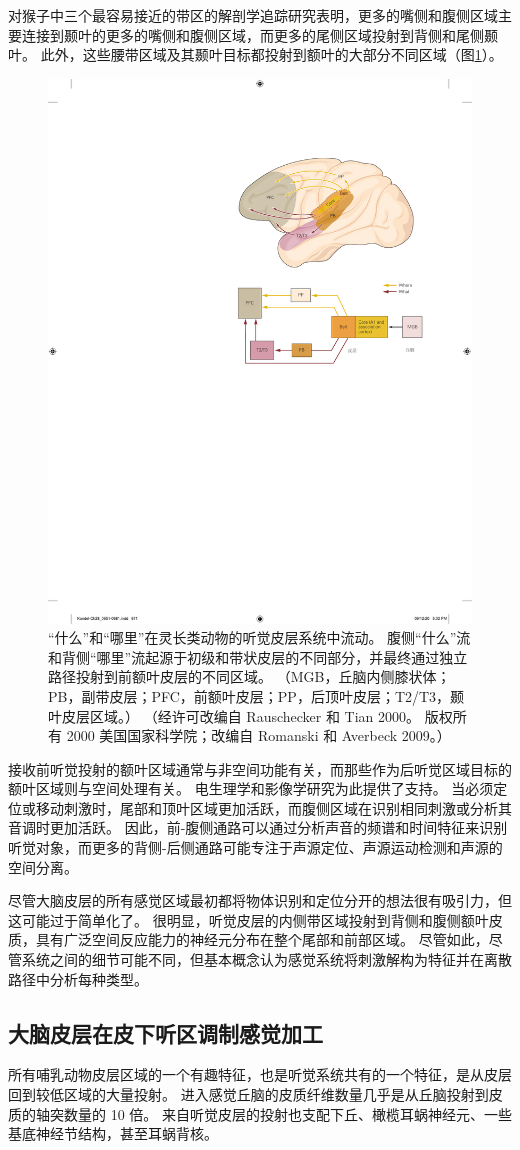 对猴子中三个最容易接近的带区的解剖学追踪研究表明，更多的嘴侧和腹侧区域主要连接到颞叶的更多的嘴侧和腹侧区域，而更多的尾侧区域投射到背侧和尾侧颞叶。 
此外，这些腰带区域及其颞叶目标都投射到额叶的大部分不同区域（图\ref{fig:28_11}）。


\begin{figure}[htbp]
	\centering
	\includegraphics[width=0.5\linewidth]{chap28/fig_28_11}
	\caption{“什么”和“哪里”在灵长类动物的听觉皮层系统中流动。 
		腹侧“什么”流和背侧“哪里”流起源于初级和带状皮层的不同部分，并最终通过独立路径投射到前额叶皮层的不同区域。
		（MGB，丘脑内侧膝状体；PB，副带皮层；PFC，前额叶皮层；PP，后顶叶皮层；T2/T3，颞叶皮层区域。）
		（经许可改编自 Rauschecker 和 Tian 2000。
		版权所有 2000 美国国家科学院；改编自 Romanski 和 Averbeck 2009。）}
	\label{fig:28_11}
\end{figure}


接收前听觉投射的额叶区域通常与非空间功能有关，而那些作为后听觉区域目标的额叶区域则与空间处理有关。 
电生理学和影像学研究为此提供了支持。 
当必须定位或移动刺激时，尾部和顶叶区域更加活跃，而腹侧区域在识别相同刺激或分析其音调时更加活跃。 
因此，前-腹侧通路可以通过分析声音的频谱和时间特征来识别听觉对象，而更多的背侧-后侧通路可能专注于声源定位、声源运动检测和声源的空间分离。


尽管大脑皮层的所有感觉区域最初都将物体识别和定位分开的想法很有吸引力，但这可能过于简单化了。 
很明显，听觉皮层的内侧带区域投射到背侧和腹侧额叶皮质，具有广泛空间反应能力的神经元分布在整个尾部和前部区域。 
尽管如此，尽管系统之间的细节可能不同，但基本概念认为感觉系统将刺激解构为特征并在离散路径中分析每种类型。



\subsection{大脑皮层在皮下听区调制感觉加工}
所有哺乳动物皮层区域的一个有趣特征，也是听觉系统共有的一个特征，是从皮层回到较低区域的大量投射。 
进入感觉丘脑的皮质纤维数量几乎是从丘脑投射到皮质的轴突数量的 10 倍。 
来自听觉皮层的投射也支配下丘、橄榄耳蜗神经元、一些基底神经节结构，甚至耳蜗背核。


